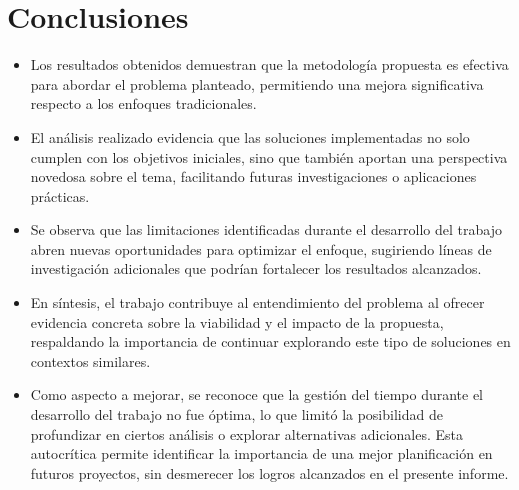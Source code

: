 \section{Conclusiones}
    \begin{itemize}
        \item Los resultados obtenidos demuestran que la metodología propuesta es efectiva para abordar el problema planteado, permitiendo una mejora significativa respecto a los enfoques tradicionales.
        \item El análisis realizado evidencia que las soluciones implementadas no solo cumplen con los objetivos iniciales, sino que también aportan una perspectiva novedosa sobre el tema, facilitando futuras investigaciones o aplicaciones prácticas.
        \item Se observa que las limitaciones identificadas durante el desarrollo del trabajo abren nuevas oportunidades para optimizar el enfoque, sugiriendo líneas de investigación adicionales que podrían fortalecer los resultados alcanzados.
        \item En síntesis, el trabajo contribuye al entendimiento del problema al ofrecer evidencia concreta sobre la viabilidad y el impacto de la propuesta, respaldando la importancia de continuar explorando este tipo de soluciones en contextos similares.
        \item Como aspecto a mejorar, se reconoce que la gestión del tiempo durante el desarrollo del trabajo no fue óptima, lo que limitó la posibilidad de profundizar en ciertos análisis o explorar alternativas adicionales. Esta autocrítica permite identificar la importancia de una mejor planificación en futuros proyectos, sin desmerecer los logros alcanzados en el presente informe.
    \end{itemize}